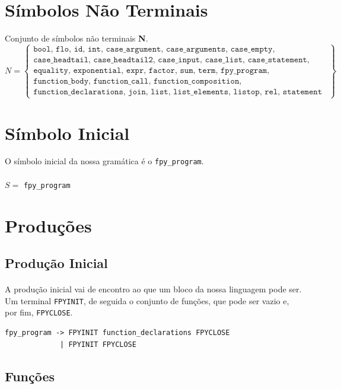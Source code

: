 \documentclass[11pt,a4paper]{report}
\begin{document}
\section{Símbolos Não Terminais}
Conjunto de símbolos não terminais \textbf{N}.
\[
N = \left\{\begin{array}{l}
\texttt{bool, flo, id, int, case_argument, case_arguments, case_empty, case_headtailID,} \\[4pt]
\texttt{case_headtail, case_headtail2, case_input, case_list, case_statement, constant,} \\[4pt] 
\texttt{equality, exponential, expr, factor, sum, term, fpy_program, function_arguments,} \\[4pt]
\texttt{function_body, function_call, function_composition, function_declaration, unary,} \\[4pt]
\texttt{function_declarations, join, list, list_elements, listop, rel, statement}
\end{array}\right\}
\]

\section{Símbolo Inicial}
O símbolo inicial da nossa gramática é o \texttt{fpy_program}.
\\\\
$S =$ \texttt{fpy_program}

\section{Produções}
\subsection{Produção Inicial}
\paragraph*{}
A produção inicial vai de encontro ao que um bloco da nossa linguagem pode ser. Um terminal \texttt{FPYINIT}, de seguida o conjunto de funções, que pode ser vazio e, por fim, \texttt{FPYCLOSE}. 

\begin{verbatim}
fpy_program -> FPYINIT function_declarations FPYCLOSE
             | FPYINIT FPYCLOSE
\end{verbatim}

\subsection{Funções}
\end{document}

